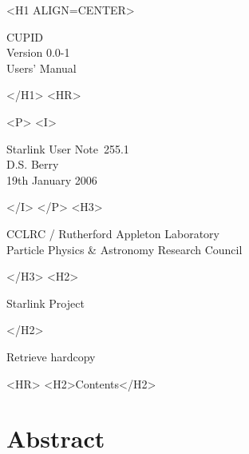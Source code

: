 \documentclass[twoside,11pt]{article}
\newcommand{\stardoccategory}  {Starlink User Note}
\newcommand{\stardocsource}    {sun\stardocnumber}
\newcommand{\stardocnumber}    {255.1}
\newcommand{\stardocauthors}   {D.S. Berry}
\newcommand{\stardocdate}      {19th January 2006}
\newcommand{\stardoctitle}     {CUPID}
\newcommand{\stardocversion}   {Version 0.0-1}
\newcommand{\stardocmanual}    {Users' Manual}
\newcommand{\htmladdnormallink}[2]{#1}
\newcommand{\htmladdimg}[1]{}
\newcommand{\htmlref}[2]{#1}
\newcommand{\htmladdtonavigation}[1]{}
\newcommand{\xlabel}[1]{}
\renewcommand{\_}{\texttt{\symbol{95}}}
\begin{document}
\begin{htmlonly}
   \xlabel{}
   \begin{rawhtml} <H1 ALIGN=CENTER> \end{rawhtml}
      \stardoctitle\\
      \stardocversion\\
      \stardocmanual
   \begin{rawhtml} </H1> <HR> \end{rawhtml}

   \begin{rawhtml} <P> <I> \end{rawhtml}
   \stardoccategory\ \stardocnumber \\
   \stardocauthors \\
   \stardocdate
   \begin{rawhtml} </I> </P> <H3> \end{rawhtml}
      \htmladdnormallink{CCLRC}{http://www.cclrc.ac.uk} /
      \htmladdnormallink{Rutherford Appleton Laboratory}
                        {http://www.cclrc.ac.uk/ral} \\
      \htmladdnormallink{Particle Physics \& Astronomy Research Council}
                        {http://www.pparc.ac.uk} \\
   \begin{rawhtml} </H3> <H2> \end{rawhtml}
      \htmladdnormallink{Starlink Project}{http://www.starlink.rl.ac.uk/}
   \begin{rawhtml} </H2> \end{rawhtml}
   \htmladdnormallink{\htmladdimg{source.gif} Retrieve hardcopy}
      {http://www.starlink.rl.ac.uk/cgi-bin/hcserver?\stardocsource}\\

  \label{stardoccontents}
  \begin{rawhtml} 
    <HR>
    <H2>Contents</H2>
  \end{rawhtml}
  \htmladdtonavigation{\htmlref{\htmladdimg{contents_motif.gif}}
        {stardoccontents}}

  \section{\xlabel{abstract}Abstract}
\end{htmlonly}
\end{document}
